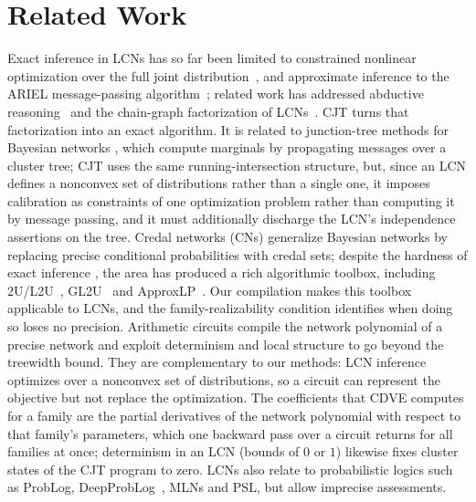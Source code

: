 \documentclass{article} %
\DeclareRobustCommand{\rev}[1]{{\color{blue}#1}}
\begin{document}
\section{Related Work}
\label{sec-related}

Exact inference in LCNs has so far been limited to constrained nonlinear optimization over the full joint distribution~\citep{marinescu2022neurips}, and approximate inference to the ARIEL message-passing algorithm~\citep{marinescu2023lcn}; related work has addressed abductive reasoning~\citep{marinescu2024neurips} and the chain-graph factorization of LCNs~\citep{cozman23a}. \rev{CJT turns that factorization into an exact algorithm. It is related to junction-tree methods for Bayesian networks \citep{spiegelhalter88,jensen90}, which compute marginals by propagating messages over a cluster tree; CJT uses the same running-intersection structure, but, since an LCN defines a nonconvex set of distributions rather than a single one, it imposes calibration as constraints of one optimization problem rather than computing it by message passing, and it must additionally discharge the LCN's independence assertions on the tree.} Credal networks (CNs) \citep{cozman2000credal} generalize Bayesian networks by replacing precise conditional probabilities with credal sets; despite the hardness of exact inference \citep{maua2020ijar,maua2014jair}, the area has produced a rich algorithmic toolbox, including 2U/L2U~\citep{l2u}, GL2U~\citep{antonucci2010} and ApproxLP~\citep{antonucci2015approxlp}. Our compilation makes this toolbox applicable to LCNs, and \rev{the family-realizability condition identifies when doing so loses no precision.} \rev{Arithmetic circuits \citep{darwiche2003differential,darwiche2009book} compile the network polynomial of a precise network and exploit determinism and local structure to go beyond the treewidth bound. They are complementary to our methods: LCN inference optimizes over a nonconvex set of distributions, so a circuit can represent the objective but not replace the optimization. The coefficients that CDVE computes for a family are the partial derivatives of the network polynomial with respect to that family's parameters, which one backward pass over a circuit returns for all families at once; determinism in an LCN (bounds of $0$ or $1$) likewise fixes cluster states of the CJT program to zero.} LCNs also relate to probabilistic logics such as ProbLog, DeepProbLog~\citep{manhaeve2018deepproblog}, MLNs and PSL, but allow imprecise assessments.
\end{document}

